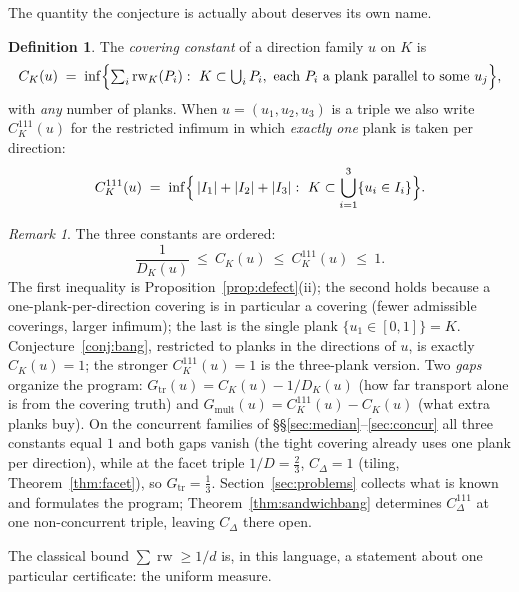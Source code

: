 \documentclass[11pt,reqno]{amsart}
\theoremstyle{plain}
\theoremstyle{definition}
\newtheorem{definition}[theorem]{Definition}
\theoremstyle{remark}
\newtheorem{remark}[theorem]{Remark}
\newcommand{\rw}{\operatorname{rw}}
\begin{document}
The quantity the conjecture is actually about deserves its own name.

\begin{definition}\label{def:covconst}
The \emph{covering constant} of a direction family $u$ on $K$ is
\[
C_K(u)\;=\;\inf\Bigl\{\textstyle\sum_i\rw_K(P_i):\ K\subset\bigcup_iP_i,\
\text{each }P_i\text{ a plank parallel to some }u_j\Bigr\},
\]
with \emph{any} number of planks. When $u=(u_1,u_2,u_3)$ is a triple we also
write $C^{111}_K(u)$ for the restricted infimum in which \emph{exactly one}
plank is taken per direction:
\[
C^{111}_K(u)\;=\;\inf\Bigl\{\,|I_1|+|I_2|+|I_3|:\ K\subset\bigcup_{i=1}^3
\{u_i\in I_i\}\Bigr\}.
\]
\end{definition}

\begin{remark}\label{rem:covconst}
The three constants are ordered:
\[
\frac1{D_K(u)}\ \le\ C_K(u)\ \le\ C^{111}_K(u)\ \le\ 1 .
\]
The first inequality is Proposition~\ref{prop:defect}(ii); the second holds
because a one-plank-per-direction covering is in particular a covering (fewer
admissible coverings, larger infimum); the last is the single plank
$\{u_1\in[0,1]\}=K$. Conjecture~\ref{conj:bang}, restricted to planks in the
directions of $u$, is exactly $C_K(u)=1$; the stronger $C^{111}_K(u)=1$ is the
three-plank version. Two \emph{gaps} organize the program:
$G_{\mathrm{tr}}(u)=C_K(u)-1/D_K(u)$ (how far transport alone is from the
covering truth) and $G_{\mathrm{mult}}(u)=C^{111}_K(u)-C_K(u)$ (what extra
planks buy). On the concurrent families of
\S\S\ref{sec:median}--\ref{sec:concur} all three constants equal $1$ and both
gaps vanish (the tight covering already uses one plank per direction), while at
the facet triple $1/D=\tfrac23$, $C_\Delta=1$ (tiling,
Theorem~\ref{thm:facet}), so $G_{\mathrm{tr}}=\tfrac13$.
Section~\ref{sec:problems} collects what is known and formulates the program;
Theorem~\ref{thm:sandwichbang} determines $C^{111}_\Delta$ at one
non-concurrent triple, leaving $C_\Delta$ there open.
\end{remark}

The classical bound $\sum\rw\ge1/d$ is, in this language, a statement about
one particular certificate: the uniform measure.
\end{document}
